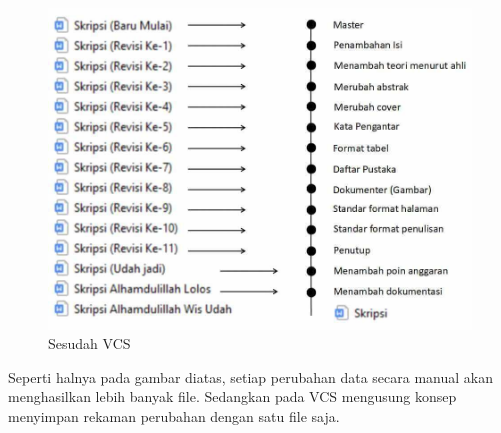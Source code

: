 \begin{figure}[H]
        \centerline{\includegraphics[scale=0.3]{figures/version-control-system/after-vcs}}
        \caption{Sesudah VCS}
\end{figure}
Seperti halnya pada gambar diatas, setiap perubahan data secara manual akan menghasilkan lebih banyak file. Sedangkan pada VCS mengusung konsep menyimpan rekaman perubahan dengan satu file saja.




